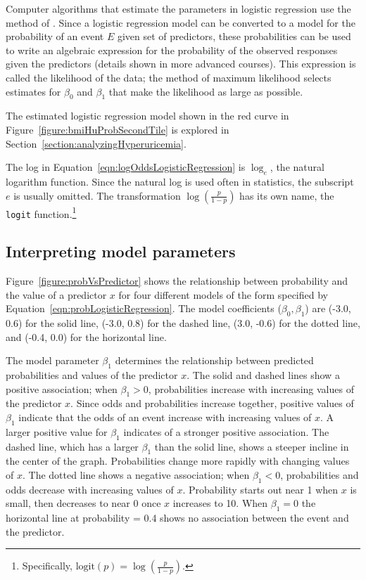 Computer algorithms that estimate the parameters in logistic regression use the method of .  Since a logistic regression model can be converted to a model for the probability of an event $E$ given set of predictors, these probabilities can be used to write an algebraic expression for the probability of the observed responses given the predictors (details shown in more advanced courses).  This expression is called the likelihood of the data; the method of maximum likelihood selects estimates for $\beta_0$ and $\beta_1$ that make the likelihood as large as possible.

The estimated logistic regression model shown in the red curve in Figure~\ref{figure:bmiHuProbSecondTile} is explored in Section~\ref{section:analyzingHyperuricemia}.

The log in Equation~\ref{eqn:logOddsLogisticRegression} is $\log_e$, the natural logarithm function.  Since the natural log is used often in statistics, the subscript $e$ is usually omitted. The transformation $\log(\frac{p}{1-p})$ has its own name, the \texttt{logit} function.\footnote{Specifically, $\text{logit}(p) = \log(\frac{p}{1-p})$.}

\newpage
\subsection{Interpreting model parameters}

Figure~\ref{figure:probVsPredictor} shows the relationship between probability and the value of a predictor $x$ for four different models of the form specified by Equation~\ref{eqn:probLogisticRegression}. The model coefficients ($\beta_0, \beta_1$) are (-3.0, 0.6) for the solid line, (-3.0, 0.8) for the dashed line, (3.0, -0.6) for the dotted line, and (-0.4, 0.0) for the horizontal line.

The model parameter $\beta_1$ determines the relationship between predicted probabilities and values of the predictor $x$. The solid and dashed lines show a positive association; when $\beta_1 > 0$, probabilities increase with increasing values of the predictor $x$. Since odds and probabilities increase together, positive values of $\beta_1$ indicate that the odds of an event increase with increasing values of $x$. A larger positive value for $\beta_1$ indicates of a stronger positive association. The dashed line, which has a larger $\beta_1$ than the solid line, shows a steeper incline in the center of the graph. Probabilities change more rapidly with changing values of $x$. The dotted line shows a negative association; when $\beta_1 < 0$, probabilities and odds decrease with increasing values of $x$. Probability starts out near 1 when $x$ is small, then decreases to near 0 once $x$ increases to 10. When $\beta_1 = 0$ the horizontal line at probability = 0.4 shows no association between the event and the predictor.

